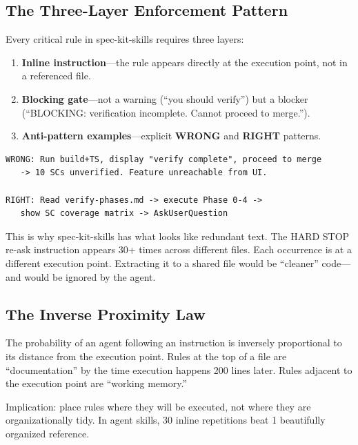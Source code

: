 \documentclass[11pt,a4paper,openright,twoside]{report}
\newcommand{\wrong}{\textcolor{specred}{\textbf{WRONG}}}
\newcommand{\rightlabel}{\textcolor{specgreen}{\textbf{RIGHT}}}
\begin{document}
\subsection{The Three-Layer Enforcement Pattern}

Every critical rule in spec-kit-skills requires three layers:

\begin{enumerate}
  \item \textbf{Inline instruction}---the rule appears directly at the execution point, not in a referenced file.
  \item \textbf{Blocking gate}---not a warning (``you should verify'') but a blocker (``BLOCKING: verification incomplete. Cannot proceed to merge.'').
  \item \textbf{Anti-pattern examples}---explicit \wrong{} and \rightlabel{} patterns.
\end{enumerate}

\begin{lstlisting}[title={Anti-Pattern Example}]
WRONG: Run build+TS, display "verify complete", proceed to merge
   -> 10 SCs unverified. Feature unreachable from UI.

RIGHT: Read verify-phases.md -> execute Phase 0-4 ->
   show SC coverage matrix -> AskUserQuestion
\end{lstlisting}

This is why spec-kit-skills has what looks like redundant text. The HARD STOP re-ask instruction appears 30+ times across different files. Each occurrence is at a different execution point. Extracting it to a shared file would be ``cleaner'' code---and would be ignored by the agent.

\subsection{The Inverse Proximity Law}

The probability of an agent following an instruction is inversely proportional to its distance from the execution point. Rules at the top of a file are ``documentation'' by the time execution happens 200 lines later. Rules adjacent to the execution point are ``working memory.''

Implication: place rules where they will be executed, not where they are organizationally tidy. In agent skills, 30 inline repetitions beat 1 beautifully organized reference.
\end{document}

